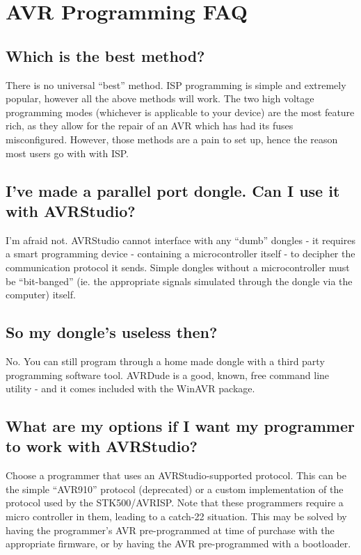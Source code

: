 \documentclass[a4paper,oneside,notitlepage]{book}
\begin{document}
\label{chp:faq}
\chapter{AVR Programming FAQ}

\section{Which is the best method?}
There is no universal ``best'' method. ISP programming is simple and extremely popular, however all the above methods will work. The two high voltage programming modes (whichever is applicable to your device) are the most feature rich, as they allow for the repair of an AVR which has had its fuses misconfigured. However, those methods are a pain to set up, hence the reason most users go with with ISP.

\section{I've made a parallel port dongle. Can I use it with AVRStudio?}
I'm afraid not. AVRStudio cannot interface with any ``dumb'' dongles - it requires a smart programming device - containing a microcontroller itself - to decipher the communication protocol it sends. Simple dongles without a microcontroller must be ``bit-banged'' (ie. the appropriate signals simulated through the dongle via the computer) itself.

\section{So my dongle's useless then?}
No. You can still program through a home made dongle with a third party programming software tool. AVRDude is a good, known, free command line utility - and it comes included with the WinAVR package.

\section{What are my options if I want my programmer to work with AVRStudio?}
Choose a programmer that uses an AVRStudio-supported protocol. This can be the simple ``AVR910'' protocol (deprecated) or a custom implementation of the protocol used by the STK500/AVRISP. Note that these programmers require a micro controller in them, leading to a catch-22 situation. This may be solved by having the programmer's AVR pre-programmed at time of purchase with the appropriate firmware, or by having the AVR pre-programmed with a bootloader.
\end{document}
